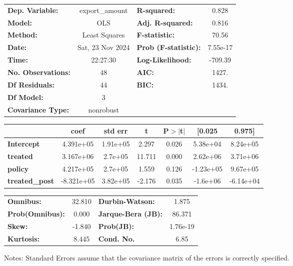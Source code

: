 \begin{center}
\begin{tabular}{lclc}
\toprule
\textbf{Dep. Variable:}    &  export\_amount  & \textbf{  R-squared:         } &     0.828   \\
\textbf{Model:}            &       OLS        & \textbf{  Adj. R-squared:    } &     0.816   \\
\textbf{Method:}           &  Least Squares   & \textbf{  F-statistic:       } &     70.56   \\
\textbf{Date:}             & Sat, 23 Nov 2024 & \textbf{  Prob (F-statistic):} &  7.55e-17   \\
\textbf{Time:}             &     22:27:30     & \textbf{  Log-Likelihood:    } &   -709.39   \\
\textbf{No. Observations:} &          48      & \textbf{  AIC:               } &     1427.   \\
\textbf{Df Residuals:}     &          44      & \textbf{  BIC:               } &     1434.   \\
\textbf{Df Model:}         &           3      & \textbf{                     } &             \\
\textbf{Covariance Type:}  &    nonrobust     & \textbf{                     } &             \\
\bottomrule
\end{tabular}
\begin{tabular}{lcccccc}
                       & \textbf{coef} & \textbf{std err} & \textbf{t} & \textbf{P$> |$t$|$} & \textbf{[0.025} & \textbf{0.975]}  \\
\midrule
\textbf{Intercept}     &    4.391e+05  &     1.91e+05     &     2.297  &         0.026        &     5.38e+04    &     8.24e+05     \\
\textbf{treated}       &    3.167e+06  &      2.7e+05     &    11.711  &         0.000        &     2.62e+06    &     3.71e+06     \\
\textbf{policy}        &    4.217e+05  &      2.7e+05     &     1.559  &         0.126        &    -1.23e+05    &     9.67e+05     \\
\textbf{treated\_post} &   -8.321e+05  &     3.82e+05     &    -2.176  &         0.035        &     -1.6e+06    &    -6.14e+04     \\
\bottomrule
\end{tabular}
\begin{tabular}{lclc}
\textbf{Omnibus:}       & 32.810 & \textbf{  Durbin-Watson:     } &    1.875  \\
\textbf{Prob(Omnibus):} &  0.000 & \textbf{  Jarque-Bera (JB):  } &   86.371  \\
\textbf{Skew:}          & -1.840 & \textbf{  Prob(JB):          } & 1.76e-19  \\
\textbf{Kurtosis:}      &  8.445 & \textbf{  Cond. No.          } &     6.85  \\
\bottomrule
\end{tabular}
\end{center}

Notes: \newline
 [1] Standard Errors assume that the covariance matrix of the errors is correctly specified.